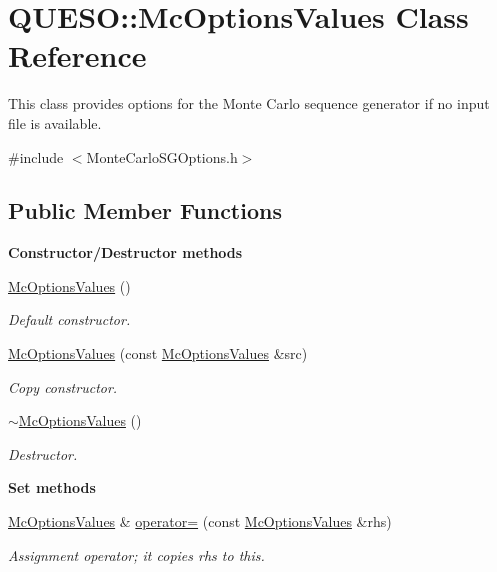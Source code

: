 \hypertarget{class_q_u_e_s_o_1_1_mc_options_values}{\section{Q\-U\-E\-S\-O\-:\-:Mc\-Options\-Values Class Reference}
\label{class_q_u_e_s_o_1_1_mc_options_values}
}


This class provides options for the Monte Carlo sequence generator if no input file is available.  




{\ttfamily \#include $<$Monte\-Carlo\-S\-G\-Options.\-h$>$}

\subsection*{Public Member Functions}
\begin{Indent}{\bf Constructor/\-Destructor methods}\par
\begin{DoxyCompactItemize}
\item 
\hyperlink{class_q_u_e_s_o_1_1_mc_options_values_a2f5f8f0ed30fdb090baddd5cde29461f}{Mc\-Options\-Values} ()
\begin{DoxyCompactList}\small\item\em Default constructor. \end{DoxyCompactList}\item 
\hyperlink{class_q_u_e_s_o_1_1_mc_options_values_a65c499559788c30081b78443bcb36ca8}{Mc\-Options\-Values} (const \hyperlink{class_q_u_e_s_o_1_1_mc_options_values}{Mc\-Options\-Values} \&src)
\begin{DoxyCompactList}\small\item\em Copy constructor. \end{DoxyCompactList}\item 
\hyperlink{class_q_u_e_s_o_1_1_mc_options_values_a6eb32ac4bf4277722e1d53eba6d1f0bc}{$\sim$\-Mc\-Options\-Values} ()
\begin{DoxyCompactList}\small\item\em Destructor. \end{DoxyCompactList}\end{DoxyCompactItemize}
\end{Indent}
\begin{Indent}{\bf Set methods}\par
\begin{DoxyCompactItemize}
\item 
\hyperlink{class_q_u_e_s_o_1_1_mc_options_values}{Mc\-Options\-Values} \& \hyperlink{class_q_u_e_s_o_1_1_mc_options_values_a5fcd5e9eab8253d0d311dd46a617eaeb}{operator=} (const \hyperlink{class_q_u_e_s_o_1_1_mc_options_values}{Mc\-Options\-Values} \&rhs)
\begin{DoxyCompactList}\small\item\em Assignment operator; it copies {\ttfamily rhs} to {\ttfamily this}. \end{DoxyCompactList}\end{DoxyCompactItemize}
\end{Indent}
